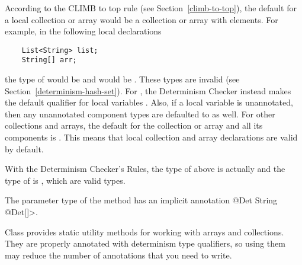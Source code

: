 According to the CLIMB to top rule (see Section~\ref{climb-to-top}), the default
for a local collection or array would be a  collection or array
with  elements. For example, in the following local declarations
\begin{Verbatim}
    List<String> list;
    String[] arr;
\end{Verbatim}
the type of  would be  and
 would be . These types are invalid (see
Section~\ref{determinism-hash-set}). For , the Determinism Checker
instead makes the default qualifier for local variables . Also, if a local
 variable is unannotated, then any unannotated component types are
defaulted to  as well. For other collections and arrays, the default
for the collection or array and all its components is . This means
that local collection and array declarations are valid by default.

With the Determinism Checker's Rules, the type of  above is actually
 and the type of  is , which are valid types.

The parameter type of the  method has an implicit annotation
\<@Det String @Det[]>.



Class  provides static
utility methods for working with arrays and collections.  They are properly
annotated with determinism type qualifiers, so using them may reduce the number
of annotations that you need to write.


